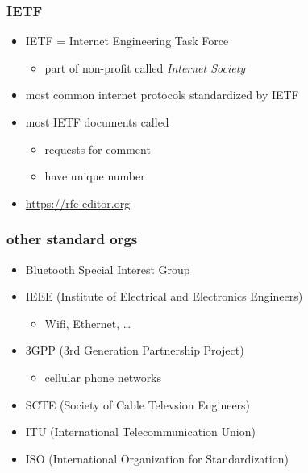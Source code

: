 \begin{frame}\frametitle{IETF}
    \begin{itemize}
    \item IETF = Internet Engineering Task Force
        \begin{itemize}
        \item part of non-profit called \textit{Internet Society}
        \end{itemize}
    \item most common internet protocols standardized by IETF
    \item most IETF documents called 
        \begin{itemize}
        \item requests for comment
        \item have unique number
        \end{itemize}
    \item \url{https://rfc-editor.org}
    \end{itemize}
\end{frame}

\begin{frame}\frametitle{other standard orgs}
    \begin{itemize}
        \item Bluetooth Special Interest Group
        \item IEEE (Institute of Electrical and Electronics Engineers)
            \begin{itemize}
            \item Wifi, Ethernet, \ldots
            \end{itemize}
        \item 3GPP (3rd Generation Partnership Project)
            \begin{itemize}
            \item cellular phone networks
            \end{itemize}
        \item SCTE (Society of Cable Televsion Engineers)
        \item ITU (International Telecommunication Union)
        \item ISO (International Organization for Standardization)
    \end{itemize}
\end{frame}
